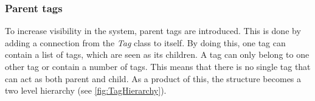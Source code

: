 



\subsubsection{Parent tags}
To increase visibility in the system, parent tags are introduced. This is done by adding a connection from the \textit{Tag} class to itself. By doing this, one tag can contain a list of tags, which are seen as its children. A tag can only belong to one other tag or contain a number of tags. This means that there is no single tag that can act as both parent and child. As a product of this, the structure becomes a two level hierarchy (see \autoref{fig:TagHierarchy}).

